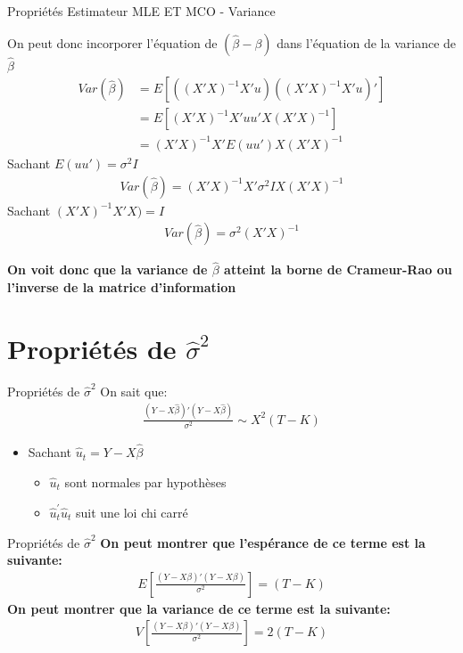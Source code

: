 \documentclass{beamer}
\begin{document}
\begin{frame}{Propriétés Estimateur MLE ET MCO - Variance}

On peut donc incorporer l'équation de $(\hat{\beta}-\beta)$ dans l'équation de la variance de $\hat{\beta}$
\begin{align*}
Var(\hat{\beta})&=E[((X'X)^{-1}X'u)((X'X)^{-1}X'u)'] \\ & = E[(X'X)^{-1}X'uu'X(X'X)^{-1}] \\ & = (X'X)^{-1}X'E(uu')X(X'X)^{-1}
\end{align*}
Sachant $E(uu')=\sigma^2I$
\begin{align*}
Var(\hat{\beta})=(X'X)^{-1}X'\sigma^2IX(X'X)^{-1}
\end{align*}
Sachant $(X'X)^{-1}X'X)=I$
\begin{align*}
Var(\hat{\beta})=\sigma^2(X'X)^{-1}
\end{align*}

\textbf{On voit donc que la variance de $\hat{\beta}$ atteint la borne de Crameur-Rao ou l'inverse de la matrice d'information}
\end{frame}

\section{Propriétés de $\hat{\sigma}^2$}

\frame{\tableofcontents[current]}


\begin{frame}{Propriétés de $\hat{\sigma}^2$}
On sait que:
\begin{align*}
\frac{(Y-X \hat{\beta})'(Y-X \hat{\beta})}{\sigma^2} \sim X^2(T-K)
\end{align*}
\begin{itemize}
\item Sachant $\hat{u}_t=Y-X \hat{\beta}$
\begin{itemize}
\item $\hat{u}_t$ sont normales par hypothèses
\item $\hat{u}_t^{'}\hat{u}_t$ suit une loi chi carré
\end{itemize}
\end{itemize}
\end{frame}

\begin{frame}{Propriétés de $\hat{\sigma}^2$}
\textbf{On peut montrer que l'espérance de ce terme est la suivante:}
\begin{align*}
E \left[ \frac{(Y-X \beta)'(Y-X \beta)}{\sigma^2}\right]=(T-K)
\end{align*}
\textbf{On peut montrer que la variance de ce terme est la suivante:}
\begin{align*}
V \left[ \frac{(Y-X \beta)'(Y-X \beta)}{\sigma^2}\right]=2(T-K)
\end{align*}
\end{frame}
\end{document}
